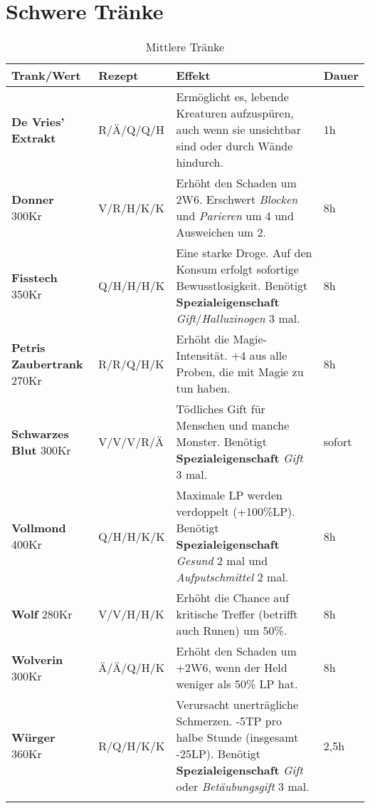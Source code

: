 \section{Schwere Tränke}
\begin{longtable}{|p{3cm}|p{}|p{8cm}|p{}|}
\hline
\textbf{Trank/Wert} & \textbf{Rezept} & \textbf{Effekt} & \textbf{Dauer} \\ \hline

\textbf{De Vries' Extrakt} & R/Ä/Q/Q/H & Ermöglicht es, lebende Kreaturen aufzuspüren, auch wenn sie unsichtbar sind oder durch Wände hindurch. & 1h \\ \hline

\textbf{Donner} 300Kr & V/R/H/K/K & Erhöht den Schaden um 2W6. Erschwert \textit{Blocken} und \textit{Parieren} um 4 und Ausweichen um 2. & 8h \\ \hline 

\textbf{Fisstech} 350Kr & Q/H/H/H/K & Eine starke Droge. Auf den Konsum erfolgt sofortige Bewusstlosigkeit. Benötigt \textbf{Spezialeigenschaft} \textit{Gift}/\textit{Halluzinogen} 3 mal. & 8h \\ \hline

\textbf{Petris Zaubertrank} 270Kr & R/R/Q/H/K & Erhöht die Magie-Intensität. +4 aus alle Proben, die mit Magie zu tun haben. & 8h \\ \hline

\textbf{Schwarzes Blut} 300Kr & V/V/V/R/Ä & Tödliches Gift für Menschen und manche Monster. Benötigt \textbf{Spezialeigenschaft} \textit{Gift} 3 mal. & sofort \\ \hline

\textbf{Vollmond} 400Kr & Q/H/H/K/K & Maximale LP werden verdoppelt (+100\%LP). Benötigt \textbf{Spezialeigenschaft} \textit{Gesund} 2 mal und \textit{Aufputschmittel} 2 mal. & 8h \\ \hline

\textbf{Wolf} 280Kr & V/V/H/H/K & Erhöht die Chance auf kritische Treffer (betrifft auch Runen) um 50\%. & 8h \\ \hline

\textbf{Wolverin} 300Kr & Ä/Ä/Q/H/K & Erhöht den Schaden um +2W6, wenn der Held weniger als 50\% LP hat. & 8h \\ \hline

\textbf{Würger} 360Kr & R/Q/H/K/K & Verursacht unerträgliche Schmerzen. -5TP pro halbe Stunde (insgesamt -25LP). Benötigt \textbf{Spezialeigenschaft} \textit{Gift} oder \textit{Betäubungsgift} 3 mal. & 2,5h \\ \hline

\caption{Mittlere Tränke}
\label{tab:mittlere_traenke}
\end{longtable}



